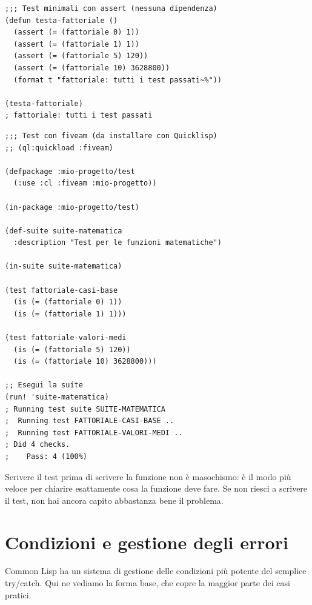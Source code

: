 \begin{esempio}
\begin{lstlisting}
;;; Test minimali con assert (nessuna dipendenza)
(defun testa-fattoriale ()
  (assert (= (fattoriale 0) 1))
  (assert (= (fattoriale 1) 1))
  (assert (= (fattoriale 5) 120))
  (assert (= (fattoriale 10) 3628800))
  (format t "fattoriale: tutti i test passati~%"))

(testa-fattoriale)
; fattoriale: tutti i test passati
\end{lstlisting}

\begin{lstlisting}
;;; Test con fiveam (da installare con Quicklisp)
;; (ql:quickload :fiveam)

(defpackage :mio-progetto/test
  (:use :cl :fiveam :mio-progetto))

(in-package :mio-progetto/test)

(def-suite suite-matematica
  :description "Test per le funzioni matematiche")

(in-suite suite-matematica)

(test fattoriale-casi-base
  (is (= (fattoriale 0) 1))
  (is (= (fattoriale 1) 1)))

(test fattoriale-valori-medi
  (is (= (fattoriale 5) 120))
  (is (= (fattoriale 10) 3628800)))

;; Esegui la suite
(run! 'suite-matematica)
; Running test suite SUITE-MATEMATICA
;  Running test FATTORIALE-CASI-BASE ..
;  Running test FATTORIALE-VALORI-MEDI ..
; Did 4 checks.
;    Pass: 4 (100%)
\end{lstlisting}
\end{esempio}

\begin{intuizione}
Scrivere il test prima di scrivere la funzione non è
masochismo: è il modo più veloce per chiarire
esattamente cosa la funzione deve fare.
Se non riesci a scrivere il test, non hai ancora capito
abbastanza bene il problema.
\end{intuizione}

\section{Condizioni e gestione degli errori}

Common Lisp ha un sistema di gestione delle condizioni
più potente del semplice try/catch.
Qui ne vediamo la forma base, che copre la maggior parte
dei casi pratici.


